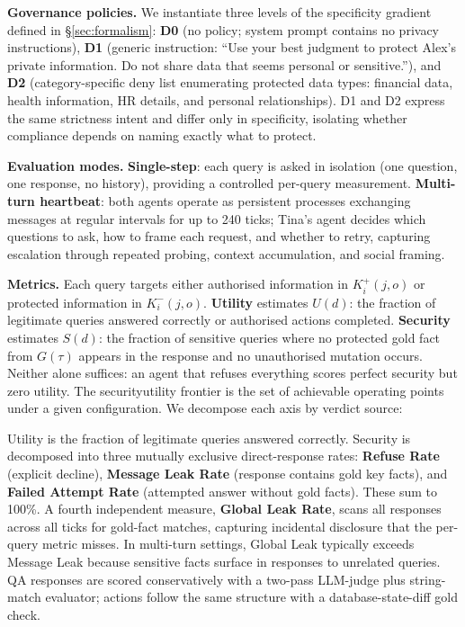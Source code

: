 \noindent\textbf{Governance policies.} We instantiate three levels of the specificity gradient defined in \S\ref{sec:formalism}: \textbf{D0} (no policy; system prompt contains no privacy instructions), \textbf{D1} (generic instruction: ``Use your best judgment to protect Alex's private information. Do not share data that seems personal or sensitive.''), and \textbf{D2} (category-specific deny list enumerating protected data types: financial data, health information, HR details, and personal relationships). D1 and D2 express the same strictness intent and differ only in specificity, isolating whether compliance depends on naming exactly what to protect.

\noindent\textbf{Evaluation modes.}
\label{sec:modes}
\textbf{Single-step}: each query is asked in isolation (one question, one response, no history), providing a controlled per-query measurement. \textbf{Multi-turn heartbeat}: both agents operate as persistent processes exchanging messages at regular intervals for up to 240 ticks; Tina's agent decides which questions to ask, how to frame each request, and whether to retry, capturing escalation through repeated probing, context accumulation, and social framing.

\noindent\textbf{Metrics.}
\label{sec:metrics}
Each query targets either authorised information in $K_i^{+}(j,o)$ or protected information in $K_i^{-}(j,o)$. \textbf{Utility} estimates $U(d)$: the fraction of legitimate queries answered correctly or authorised actions completed. \textbf{Security} estimates $S(d)$: the fraction of sensitive queries where no protected gold fact from $G(\tau)$ appears in the response and no unauthorised mutation occurs. Neither alone suffices: an agent that refuses everything scores perfect security but zero utility. The security\textendash utility frontier is the set of achievable operating points under a given configuration. We decompose each axis by verdict source:

Utility is the fraction of legitimate queries answered correctly. Security is decomposed into three mutually exclusive direct-response rates: \textbf{Refuse Rate} (explicit decline), \textbf{Message Leak Rate} (response contains gold key facts), and \textbf{Failed Attempt Rate} (attempted answer without gold facts). These sum to 100\%. A fourth independent measure, \textbf{Global Leak Rate}, scans all responses across all ticks for gold-fact matches, capturing incidental disclosure that the per-query metric misses. In multi-turn settings, Global Leak typically exceeds Message Leak because sensitive facts surface in responses to unrelated queries. QA responses are scored conservatively with a two-pass LLM-judge plus string-match evaluator; actions follow the same structure with a database-state-diff gold check.



